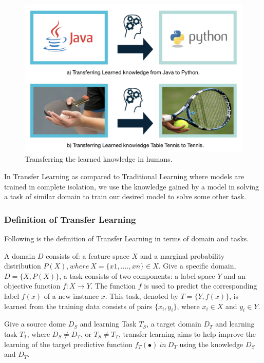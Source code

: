 \documentclass[a4paper, 12pt]{article}
\begin{document}
\begin{sloppypar}
\begin{figure}[H]
\begin{center}
\includegraphics[scale=0.25]{human_lt.png}
\caption{Transferring the learned knowledge in humans.\label{human}} %
\end{center}
\end{figure}

In Transfer Learning as compared to Traditional Learning  where models are trained in complete  isolation, we use the knowledge gained by a model in solving a task of similar domain to train our desired model to solve some other task.

\subsubsection{Definition of Transfer Learning}

Following is the definition of Transfer Learning in terms of domain and tasks.

A domain $D$ consists of: a feature space $X$ and a marginal probability distribution $P(X), where\ X = \{x1, ...., xn\} \in X$.  Give a specific domain, $D = \{X, P(X)\}$, a task consists of two components: a label space $Y$ and an objective function $f: X \rightarrow Y$. The function $f$ is used to predict the corresponding label $f(x)$ of a new instance $x$. This task, denoted by $T = \{Y, f(x)\}$, is learned from the training data consists of pairs $\{x_i, y_i\}$, where $x_i \in X$ and $y_i \in Y$. %

Give a source dome $D_S$ and learning Task $T_S$, a target domain $D_T$  and learning task $T_T$, where $D_S \ne D_T$, or $T_S \ne T_T$, transfer learning aims to help improve the learning of the target predictive function $f_T( \bullet ) \ in \ D_T$ using the knowledge $D_S$ and $D_T$. %


\end{sloppypar}
\end{document}
